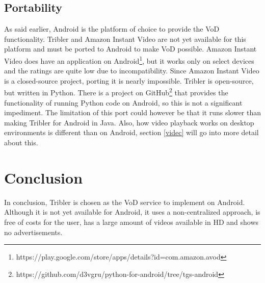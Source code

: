 \subsection{Portability}
As said earlier, Android is the platform of choice to provide the VoD functionality. Tribler and Amazon Instant Video are not yet available for this platform and must be ported to Android to make VoD possible. Amazon Instant Video does have an application on Android\footnote{https://play.google.com/store/apps/details?id=com.amazon.avod}, but it works only on select devices and the ratings are quite low due to incompatibility. Since Amazon Instant Video is a closed-source project, porting it is nearly impossible. Tribler is open-source, but written in Python. There is a project on GitHub\footnote{https://github.com/d3vgru/python-for-android/tree/tgs-android} that provides the functionality of running Python code on Android, so this is not a significant impediment. The limitation of this port could however be that it runs slower than making Tribler for Android in Java. Also, how video playback works on desktop environments is different than on Android, section \ref{videc} will go into more detail about this.
\section{Conclusion}
In conclusion, Tribler is chosen as the VoD service to implement on Android. Although it is not yet available for Android, it uses a non-centralized approach, is free of costs for the user, has a large amount of videos available in HD and shows no advertisements.